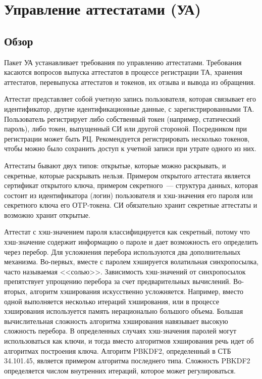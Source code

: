 \section{Управление аттестатами (УА)}\label{CM}

\subsection{Обзор}\label{CM.Intro}

Пакет УА устанавливает требования по управлению аттестатами.
Требования касаются вопросов выпуска аттестатов в процессе регистрации ТА,
хранения аттестатов, перевыпуска аттестатов и токенов, их отзыва и вывода из
обращения.

Аттестат представляет собой учетную запись пользователя, которая связывает
его идентификатор, другие идентификационные данные, с зарегистрированными ТА.
%
Пользователь регистрирует либо собственный токен (например, статический пароль), 
либо токен, выпущенный СИ или другой стороной. 
%
Посредником при регистрации может быть РЦ. Рекомендуется регистрировать 
несколько токенов, чтобы можно было сохранить доступ к учетной записи при 
утрате одного из них.


Аттестаты бывают двух типов: открытые, которые можно раскрывать, и 
секретные, которые раскрывать нельзя. 
%
Примером открытого аттестата является сертификат открытого ключа, примером 
секретного~--- структура данных, которая состоит из идентификатора 
(логин) пользователя и хэш-значения его пароля или секретного ключа его 
ОTP-токена.
%
СИ обязательно хранит секретные аттестаты и возможно хранит открытые.

Аттестат с хэш-значением пароля классифицируется как секретный, потому что 
хэш-значение содержит информацию о пароле и дает возможность его определить
через перебор.
%
Для усложнения перебора используются два дополнительных механизма.
%
Во-первых, вместе с паролем хэшируется волатильная синхропосылка, часто 
называемая <<солью>>. Зависимость хэш-значений от синхропосылок препятствует 
упрощению перебора за счет предварительных вычислений.
%
Во-вторых, алгоритм хэширования искусственно усложняется. Например, вместо одной
выполняется несколько итераций хэширования, или в процессе хэширования 
используется память нерационально большого объема.
%
Большая вычислительная сложность алгоритма хэширования навязывает высокую 
сложность перебора.
%
В определенных случаях хэш-значения паролей могут использоваться как ключи,
и тогда вместо алгоритмов хэширования речь идет об алгоритмах построения 
ключа. 
%
Алгоритм PBKDF2, определенный в СТБ 34.101.45, является примером алгоритма
последнего типа. Сложность PBKDF2 определяется числом внутренних итераций,
которое может регулироваться.

